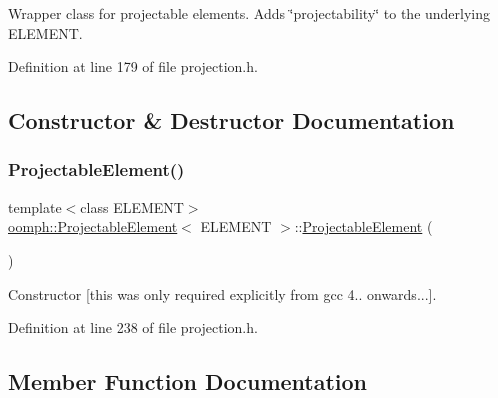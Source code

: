 Wrapper class for projectable elements. Adds \char`\"{}projectability\char`\"{} to the underlying E\+L\+E\+M\+E\+NT. 

Definition at line 179 of file projection.\+h.



\subsection{Constructor \& Destructor Documentation}
\mbox{\label{classoomph_1_1ProjectableElement_a1892a2e757d35952be803d56078a3320}} 
\subsubsection{\texorpdfstring{Projectable\+Element()}{ProjectableElement()}}
{\footnotesize\ttfamily template$<$class E\+L\+E\+M\+E\+NT$>$ \\
\hyperlink{classoomph_1_1ProjectableElement}{oomph\+::\+Projectable\+Element}$<$ E\+L\+E\+M\+E\+NT $>$\+::\hyperlink{classoomph_1_1ProjectableElement}{Projectable\+Element} (\begin{DoxyParamCaption}{ }\end{DoxyParamCaption})\hspace{0.3cm}{\ttfamily [inline]}}



Constructor \mbox{[}this was only required explicitly from gcc 4.. onwards...\mbox{]}. 



Definition at line 238 of file projection.\+h.



\subsection{Member Function Documentation}
\mbox{\label{classoomph_1_1ProjectableElement_a9e7e6d213f5e28d4b1e91433d4efb74c}} 
